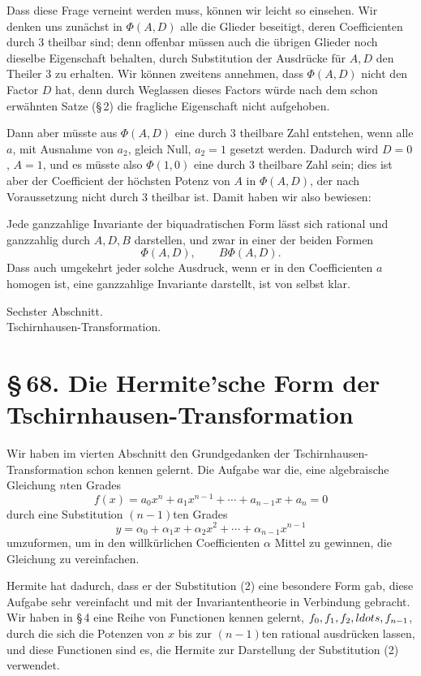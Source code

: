 \documentclass[11pt]{article}
\providecommand{\sect}[2]{\section*{\S\,#1. #2}}
\begin{document}
Dass diese Frage verneint werden muss, können wir leicht so einsehen. Wir denken uns zunächst in $\Phi(A,D)$ alle die Glieder beseitigt, deren Coefficienten durch $3$ theilbar sind; denn offenbar müssen auch die übrigen Glieder noch dieselbe Eigenschaft behalten, durch Substitution der Ausdrücke für $A,D$ den Theiler $3$ zu erhalten. Wir können zweitens annehmen, dass $\Phi(A,D)$ nicht den Factor $D$ hat, denn durch Weglassen dieses Factors würde nach dem schon erwähnten Satze (\S\,2) die fragliche Eigenschaft nicht aufgehoben.

Dann aber müsste aus $\Phi(A,D)$ eine durch $3$ theilbare Zahl entstehen, wenn alle $a$, mit Ausnahme von $a_2$, gleich Null, $a_2=1$ gesetzt werden. Dadurch wird $D=0$, $A=1$, und es müsste also $\Phi(1,0)$ eine durch $3$ theilbare Zahl sein; dies ist aber der Coefficient der höchsten Potenz von $A$ in $\Phi(A,D)$, der nach Voraussetzung nicht durch $3$ theilbar ist. Damit haben wir also bewiesen:

Jede ganzzahlige Invariante der biquadratischen Form lässt sich rational und ganzzahlig durch $A,D,B$ darstellen, und zwar in einer der beiden Formen
\[
 \Phi(A,D),
 \qquad
 B\Phi(A,D).
\]
Dass auch umgekehrt jeder solche Ausdruck, wenn er in den Coefficienten $a$ homogen ist, eine ganzzahlige Invariante darstellt, ist von selbst klar.

\begin{center}
{\large Sechster Abschnitt.}\\[0.4em]
{\Large Tschirnhausen-Transformation.}
\end{center}

\sect{68}{Die Hermite'sche Form der Tschirnhausen-Transformation}

Wir haben im vierten Abschnitt den Grundgedanken der Tschirnhausen-Transformation schon kennen gelernt. Die Aufgabe war die, eine algebraische Gleichung $n$ten Grades
\begin{equation}
 f(x)=a_0x^n+a_1x^{n-1}+\cdots+a_{n-1}x+a_n=0
\tag{1}
\end{equation}
durch eine Substitution $(n-1)$ten Grades
\begin{equation}
 y=\alpha_0+\alpha_1x+\alpha_2x^2+\cdots+\alpha_{n-1}x^{n-1}
\tag{2}
\end{equation}
umzuformen, um in den willkürlichen Coefficienten $\alpha$ Mittel zu gewinnen, die Gleichung zu vereinfachen.

Hermite hat dadurch, dass er der Substitution (2) eine besondere Form gab, diese Aufgabe sehr vereinfacht und mit der Invariantentheorie in Verbindung gebracht. Wir haben in \S\,4 eine Reihe von Functionen kennen gelernt, $f_0,f_1,f_2,\\ldots,f_{n-1}$, durch die sich die Potenzen von $x$ bis zur $(n-1)$ten rational ausdrücken lassen, und diese Functionen sind es, die Hermite zur Darstellung der Substitution (2) verwendet.
\end{document}
